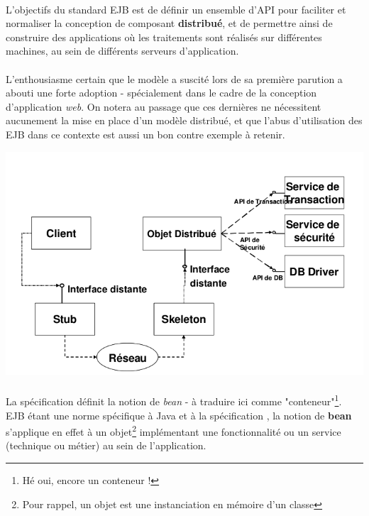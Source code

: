 {   \paragraph{} L'objectifs du standard EJB est de définir un ensemble d'API pour faciliter et
   normaliser la conception de composant \textbf{distribué}, et de permettre ainsi de construire
   des applications où les traitements sont réalisés sur différentes machines, au sein de différents
   serveurs d'application.

   \paragraph{} L'enthousiasme certain que le modèle a suscité lors de sa première parution a
   abouti une forte adoption - spécialement dans le cadre de la conception d'application
   \textit{web}. On notera au passage que ces dernières ne nécessitent aucunement la mise en place
   d'un modèle distribué, et que l'abus d'utilisation des EJB dans ce contexte est aussi un bon
   contre exemple à retenir.

   \begin{center}
     \includegraphics[scale=0.3]{img/ejb-overview.png}
   \end{center}

   \paragraph{} La spécification définit la notion de \textit{bean} - à traduire ici comme
   "conteneur"\footnote{Hé oui, encore un conteneur !}. EJB étant une norme spécifique à Java et à
   la spécification , la    notion de \textbf{bean} s'applique en effet à un
   objet\footnote{Pour rappel, un objet est une instanciation en mémoire d'un classe} implémentant une
   fonctionnalité ou un service (technique ou métier) au sein de l'application.

}
